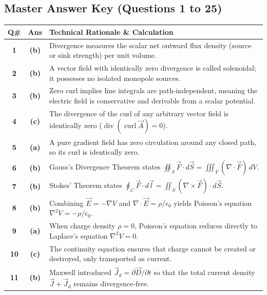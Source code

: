 \subsection*{Master Answer Key (Questions 1 to 25)}

{\small
\noindent\begin{tabularx}{\textwidth}{|c|c|X|}
\hline
\textbf{Q\#} & \textbf{Ans} & \textbf{Technical Rationale \& Calculation} \\
\hline
\textbf{1} & \textbf{(b)} & Divergence measures the scalar net outward flux density (source or sink strength) per unit volume. \\ \hline
\textbf{2} & \textbf{(b)} & A vector field with identically zero divergence is called solenoidal; it possesses no isolated monopole sources. \\ \hline
\textbf{3} & \textbf{(b)} & Zero curl implies line integrals are path-independent, meaning the electric field is conservative and derivable from a scalar potential. \\ \hline
\textbf{4} & \textbf{(c)} & The divergence of the curl of any arbitrary vector field is identically zero ($\operatorname{div}(\operatorname{curl} \vec{A}) = 0$). \\ \hline
\textbf{5} & \textbf{(a)} & A pure gradient field has zero circulation around any closed path, so its curl is identically zero. \\ \hline
\textbf{6} & \textbf{(b)} & Gauss's Divergence Theorem states $\oiint_S \vec{F}\cdot d\vec{S} = \iiint_V (\nabla \cdot \vec{F})\,dV$. \\ \hline
\textbf{7} & \textbf{(b)} & Stokes' Theorem states $\oint_C \vec{F} \cdot d\vec{l} = \iint_S (\nabla \times \vec{F})\cdot d\vec{S}$. \\ \hline
\textbf{8} & \textbf{(b)} & Combining $\vec{E} = -\nabla V$ and $\nabla \cdot \vec{E} = \rho/\epsilon_0$ yields Poisson's equation $\nabla^2 V = -\rho/\epsilon_0$. \\ \hline
\textbf{9} & \textbf{(a)} & When charge density $\rho = 0$, Poisson's equation reduces directly to Laplace's equation $\nabla^2 V = 0$. \\ \hline
\textbf{10} & \textbf{(c)} & The continuity equation ensures that charge cannot be created or destroyed, only transported as current. \\ \hline
\textbf{11} & \textbf{(b)} & Maxwell introduced $\vec{J}_d = \partial \vec{D}/\partial t$ so that the total current density $\vec{J} + \vec{J}_d$ remains divergence-free. \\ \hline

\end{tabularx}}
